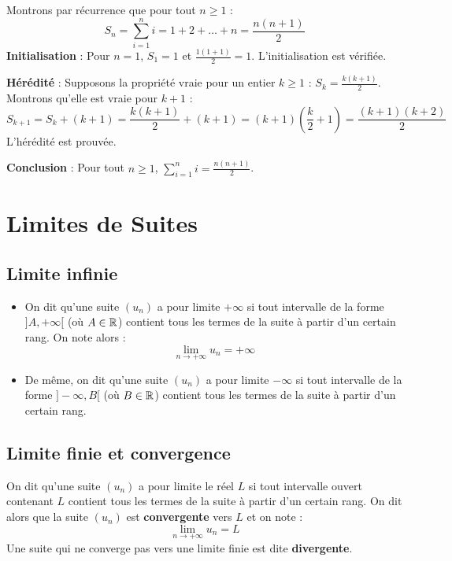 \begin{exemple}
Montrons par récurrence que pour tout $n \ge 1$ :
\[
S_n = \sum_{i=1}^n i = 1 + 2 + \dots + n = \frac{n(n+1)}{2}
\]
\textbf{Initialisation} : Pour $n = 1$, $S_1 = 1$ et $\frac{1(1+1)}{2} = 1$. L'initialisation est vérifiée.

\textbf{Hérédité} : Supposons la propriété vraie pour un entier $k \ge 1$ : $S_k = \frac{k(k+1)}{2}$.
Montrons qu'elle est vraie pour $k+1$ :
\[
S_{k+1} = S_k + (k+1) = \frac{k(k+1)}{2} + (k+1) = (k+1)\left( \frac{k}{2} + 1 \right) = \frac{(k+1)(k+2)}{2}
\]
L'hérédité est prouvée.

\textbf{Conclusion} : Pour tout $n \ge 1$, $\sum_{i=1}^n i = \frac{n(n+1)}{2}$.
\end{exemple}

\section{Limites de Suites}

\subsection{Limite infinie}

\begin{definition}
\begin{itemize}
    \item On dit qu'une suite $(u_n)$ a pour limite $+\infty$ si tout intervalle de la forme $]A, +\infty[$ (où $A \in \mathbb{R}$) contient tous les termes de la suite à partir d'un certain rang. On note alors :
    \[
    \lim_{n \to +\infty} u_n = +\infty
    \]
    \item De même, on dit qu'une suite $(u_n)$ a pour limite $-\infty$ si tout intervalle de la forme $]-\infty, B[$ (où $B \in \mathbb{R}$) contient tous les termes de la suite à partir d'un certain rang.
\end{itemize}
\end{definition}

\subsection{Limite finie et convergence}

\begin{definition}
On dit qu'une suite $(u_n)$ a pour limite le réel $L$ si tout intervalle ouvert contenant $L$ contient tous les termes de la suite à partir d'un certain rang. On dit alors que la suite $(u_n)$ est \textbf{convergente} vers $L$ et on note :
\[
\lim_{n \to +\infty} u_n = L
\]
Une suite qui ne converge pas vers une limite finie est dite \textbf{divergente}.
\end{definition}

